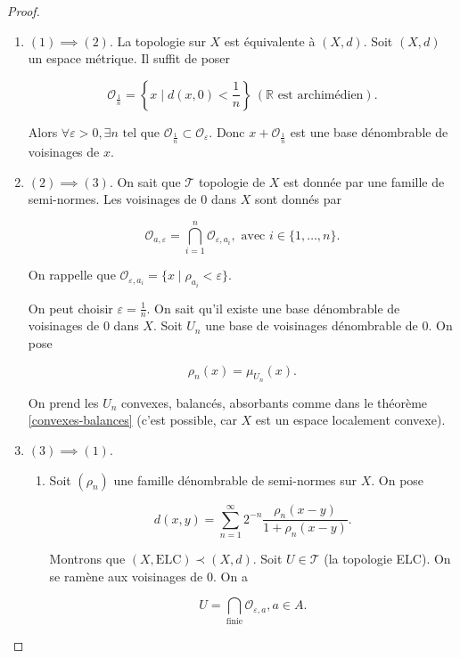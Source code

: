 \documentclass[french]{book}
\theoremstyle{definition}
\newcommand{\lesss}{<}
\newcommand{\less}{\lesss}
\newcommand{\biggg}{>}
\newcommand{\bg}{\biggg}
\begin{document}
\begin{proof}
  \begin{enumerate}
    \item \((1) \implies (2)\). La topologie sur \(X\) est équivalente à \((X,d)\). Soit \((X,d)\) un espace métrique. Il suffit de poser

    \[\mathcal{O} _{\frac{1}{n}} = \left\{ x \mid d(x,0) \less \frac{1}{n}\right\} \ (\mathbb{R} \text{ est archimédien}). \]

    Alors \(\forall \varepsilon \bg 0, \exists n \text{ tel que } \mathcal{O} _{\frac{1}{n}} \subset \mathcal{O} _{\varepsilon}\). Donc \(x + \mathcal{O} _{\frac{1}{n}}\) est une base dénombrable de voisinages de \(x\).

    \item \((2) \implies (3)\). On sait que \(\mathscr{T}\) topologie de \(X\) est donnée par une famille de semi-normes. Les voisinages de 0 dans \(X\) sont donnés par

    \[\mathcal{O} _{a, \varepsilon} = \bigcap _{i=1} ^{n} \mathcal{O} _{\varepsilon, a_i}, \text{ avec } i \in \{ 1, \dots, n \}.\]

    On rappelle que \(\mathcal{O} _{\varepsilon,a_i} = \{ x \mid \rho _{a_i} \less \varepsilon \}\).

    On peut choisir \(\varepsilon = \frac{1}{n}\). On sait qu'il existe une base dénombrable de voisinages de 0 dans \(X\). Soit \(U_n\) une base de voisinages dénombrable de 0. On pose

    \[\rho_n(x) = \mu _{U_n}(x).\]

    On prend les \(U_n\) convexes, balancés, absorbants comme dans le théorème \ref{convexes-balances} (c'est possible, car \(X\) est un espace localement convexe).

    \item \((3) \implies (1)\).

    \begin{enumerate}
      \item Soit \( (\rho_n)\) une famille dénombrable de semi-normes sur \(X\). On pose

      \[d(x,y) = \sum_{n=1}^{\infty} 2 ^{-n} \frac{\rho_n(x-y)}{1 + \rho_n(x-y)}.\]

      Montrons que \((X, \text{ELC}) \prec (X, d)\). Soit \(U \in \mathscr{T}\) (la topologie ELC). On se ramène aux voisinages de 0. On a

      \[U = \bigcap _{\text{finie}} \mathcal{O} _{\varepsilon, a}, a \in A. \]


\end{enumerate}
\end{enumerate}
\end{proof}
\end{document}
